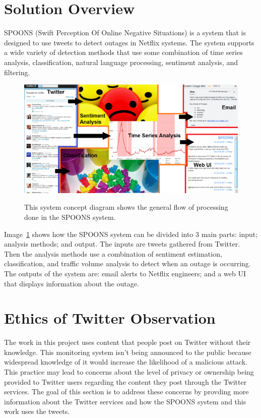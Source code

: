 \documentclass[12pt]{ucthesis}
\newcommand{\captionfonts}{\small\bf\ssp}
\begin{document}
\section{Solution Overview}
\label{overview}

SPOONS (Swift Perception Of Online Negative Situations) is a system that is
designed to use tweets to detect outages in Netflix systems. The system
supports a wide variety of detection methods that use some combination of time
series analysis, classification, natural language processing, sentiment
analysis, and filtering.

\begin{figure}
   \begin{center}
      \includegraphics[width=140mm]{images/systemFlow.eps}
      \captionfonts
      \caption[System Concept Diagram]{This system concept diagram shows the general
                                       flow of processing done in the SPOONS system.}
      \label{fig:systemFlow}
   \end{center}
\end{figure}

Image~\ref{fig:systemFlow} shows how the SPOONS system can be divided into 3
main parts: {\color{blue}input}; {\color{orange}analysis methods}; and
{\color{red}output}. The inputs are tweets gathered from Twitter. Then the
analysis methods use a combination of sentiment estimation, classification, and
traffic volume analysis to detect when an outage is occurring.
The outputs of the system are: email alerts to Netflix engineers; and a web UI that displays
information about the outage.

\section{Ethics of Twitter Observation}

The work in this project uses content that people post on Twitter without their
knowledge. This monitoring system isn't being announced to the
public because widespread knowledge of it would increase the likelihood of a
malicious attack. This practice may lead to concerns about the level of privacy
or ownership being provided to Twitter users regarding the content they post
through the Twitter services. The goal of this section is to address these
concerns by provding more information about the Twitter services and how the
SPOONS system and this work uses the tweets.
\end{document}
